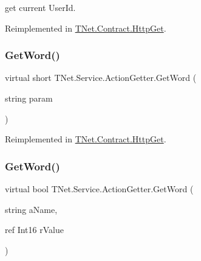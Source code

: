 get current User\+Id. 



Reimplemented in \mbox{\hyperlink{class_t_net_1_1_contract_1_1_http_get_a7b5dc9b46cf6f1536977fcd46e63dbb1}{T\+Net.\+Contract.\+Http\+Get}}.

\mbox{\label{class_t_net_1_1_service_1_1_action_getter_a38f3f98294b26f2d4b4a281db0550e52}} 
\subsubsection{\texorpdfstring{Get\+Word()}{GetWord()}\hspace{0.1cm}{\footnotesize\ttfamily [1/5]}}
{\footnotesize\ttfamily virtual short T\+Net.\+Service.\+Action\+Getter.\+Get\+Word (\begin{DoxyParamCaption}\item[{string}]{param }\end{DoxyParamCaption})\hspace{0.3cm}{\ttfamily [virtual]}}







Reimplemented in \mbox{\hyperlink{class_t_net_1_1_contract_1_1_http_get_a0b7f40b6bb3468dbd02512645538a12e}{T\+Net.\+Contract.\+Http\+Get}}.

\mbox{\label{class_t_net_1_1_service_1_1_action_getter_a7467c66b18a80f2eb51e936864f0a80a}} 
\subsubsection{\texorpdfstring{Get\+Word()}{GetWord()}\hspace{0.1cm}{\footnotesize\ttfamily [2/5]}}
{\footnotesize\ttfamily virtual bool T\+Net.\+Service.\+Action\+Getter.\+Get\+Word (\begin{DoxyParamCaption}\item[{string}]{a\+Name,  }\item[{ref Int16}]{r\+Value }\end{DoxyParamCaption})\hspace{0.3cm}{\ttfamily [virtual]}}







